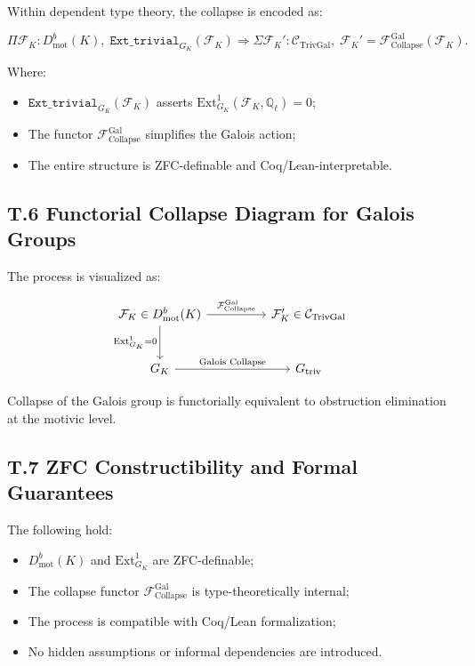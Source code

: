 \documentclass[11pt]{article}
\begin{document}
Within dependent type theory, the collapse is encoded as:

\[
\Pi \mathcal{F}_K : D^b_{\mathrm{mot}}(K),\;
\texttt{Ext\_trivial}_{G_K}(\mathcal{F}_K)
\Rightarrow
\Sigma \mathcal{F}_K' : \mathcal{C}_{\mathrm{TrivGal}},\;
\mathcal{F}_K' = \mathcal{F}_{\mathrm{Collapse}}^{\mathrm{Gal}}(\mathcal{F}_K).
\]

Where:
\begin{itemize}
    \item $\texttt{Ext\_trivial}_{G_K}(\mathcal{F}_K)$ asserts $\mathrm{Ext}^1_{G_K}(\mathcal{F}_K, \mathbb{Q}_\ell) = 0$;
    \item The functor $\mathcal{F}_{\mathrm{Collapse}}^{\mathrm{Gal}}$ simplifies the Galois action;
    \item The entire structure is ZFC-definable and Coq/Lean-interpretable.
\end{itemize}

\subsection*{T.6 Functorial Collapse Diagram for Galois Groups}

The process is visualized as:

\[
\begin{tikzcd}[column sep=huge, row sep=large]
\mathcal{F}_K \in D^b_{\mathrm{mot}}(K) \arrow[r, "{\mathcal{F}_{\mathrm{Collapse}}^{\mathrm{Gal}}}"] \arrow[d, swap, "{\mathrm{Ext}^1_{G_K} = 0}"]
& \mathcal{F}_K' \in \mathcal{C}_{\mathrm{TrivGal}} \\
G_K \arrow[r, "{\text{Galois Collapse}}"]
& G_{\mathrm{triv}}
\end{tikzcd}
\]

Collapse of the Galois group is functorially equivalent to obstruction elimination at the motivic level.

\subsection*{T.7 ZFC Constructibility and Formal Guarantees}

The following hold:

\begin{itemize}
    \item $D^b_{\mathrm{mot}}(K)$ and $\mathrm{Ext}^1_{G_K}$ are ZFC-definable;
    \item The collapse functor $\mathcal{F}_{\mathrm{Collapse}}^{\mathrm{Gal}}$ is type-theoretically internal;
    \item The process is compatible with Coq/Lean formalization;
    \item No hidden assumptions or informal dependencies are introduced.
\end{itemize}
\end{document}
